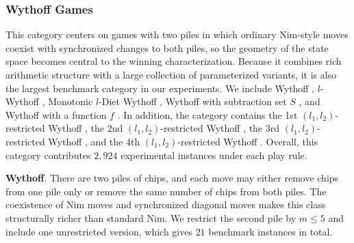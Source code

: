 \documentclass[review]{elsarticle}
\newcommand{\set}[1]{\{ #1 \}}
\newcommand{\tuple}[1]{\langle {#1} \rangle}
\newcommand{\true}{\top}
\newcommand{\statevar}{\mathcal{X}}
\newcommand{\act}{\mathcal{A}}
\newcommand{\constraint}{\mathcal{C}}
\newcommand{\estate}{\mathcal{E}}
\newcommand{\pre}{\mathtt{pre}}
\newcommand{\eff}{\mathtt{eff}}
\begin{document}
\subsubsection{Wythoff Games}
This category centers on games with two piles in which ordinary Nim-style moves coexist with synchronized changes to both piles, so the geometry of the state space becomes central to the winning characterization.
Because it combines rich arithmetic structure with a large collection of parameterized variants, it is also the largest benchmark category in our experiments.
We include Wythoff \cite{Wyt1907}, $l$-Wythoff \cite{Fra1982}, Monotonic $l$-Diet Wythoff \cite{AhnCCEFGGKMPS2017}, Wythoff with subtraction set $S$ \cite{DucFGN2009}, and Wythoff with a function $f$ \cite{LiuZ2015}.
In addition, the category contains the 1st $(l_1,l_2)$-restricted Wythoff \cite{FraH2014}, the 2nd $(l_1,l_2)$-restricted Wythoff \cite{Gur2012}, the 3rd $(l_1,l_2)$-restricted Wythoff \cite{LiuL2014}, and the 4th $(l_1,l_2)$-restricted Wythoff \cite{EriS2009}.
Overall, this category contributes $2,924$ experimental instances under each play rule.

\textbf{Wythoff}. There are two piles of chips, and each move may either remove chips from one pile only or remove the same number of chips from both piles.
The coexistence of Nim moves and synchronized diagonal moves makes this class structurally richer than standard Nim.
We restrict the second pile by $m \le 5$ and include one unrestricted version, which gives $21$ benchmark instances in total.
\end{document}
